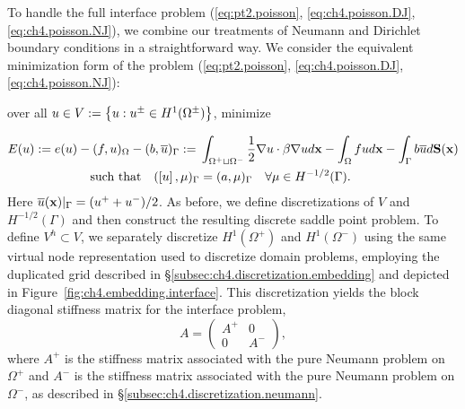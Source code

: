 To handle the full interface problem (\ref{eq:pt2.poisson}, \ref{eq:ch4.poisson.DJ}, \ref{eq:ch4.poisson.NJ}), we combine our treatments of Neumann and Dirichlet boundary conditions in a straightforward way. We consider the equivalent minimization form of the problem (\ref{eq:pt2.poisson}, \ref{eq:ch4.poisson.DJ}, \ref{eq:ch4.poisson.NJ}):
\begin{center}
over all $u \in V := \left\lbrace  u : u^\pm \in H^1(\Omega^{\pm})  \right\rbrace$, minimize
\end{center}
\begin{align}
E(u) := e(u) - (f,u)_{\Omega} - (b, \overline{u})_{\Gamma} := {} & \int_{\Omega^+ \sqcup \Omega^-} \frac{1}{2} \nabla u \cdot \beta \nabla u d\mathbf{x} - \int_{\Omega} f u d\mathbf{x} - \int_{\Gamma} b \overline{u} d\mathbf{S}(\mathbf{x}) \label{eq:ch4.interface.energy.continuous} \\ 
\text{such that} \quad (\left[ u \right], \mu)_{\Gamma} & = (a,\mu)_{\Gamma} \quad \forall \mu \in H^{-1/2}(\Gamma). \label{eq:interface.constraint.continuous}
\end{align}
Here $\overline{u}(\mathbf{x}) \rvert_{\Gamma} = (u^+ + u^-) / 2$. As before, we define discretizations of $V$ and $H^{-1/2}(\Gamma)$ and then construct the resulting discrete saddle point problem. To define $V^h \subset V$, we separately discretize $H^1(\Omega^+)$ and $H^1(\Omega^-)$ using the same virtual node representation used to discretize domain problems, employing the duplicated grid described in \S\ref{subsec:ch4.discretization.embedding} and depicted in Figure~\ref{fig:ch4.embedding.interface}. This discretization yields the block diagonal stiffness matrix for the interface problem,
\begin{equation} \label{eq:ch4.interface.stiffnessmatrix}
A = \begin{pmatrix} A^+ & 0 \\ 0 & A^- \end{pmatrix},
\end{equation}
where $A^+$ is the stiffness matrix associated with the pure Neumann problem on $\Omega^+$ and $A^-$ is the stiffness matrix associated with the pure Neumann problem on $\Omega^-$, as described in \S\ref{subsec:ch4.discretization.neumann}.

